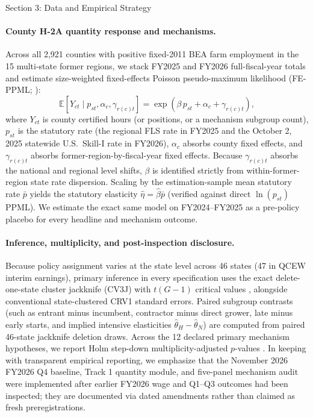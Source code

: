 \begin{llmdraft}{Section 3: Data and Empirical Strategy}
\paragraph{County H-2A quantity response and mechanisms.}
Across all 2,921 counties with positive fixed-2011 BEA farm employment in the 15
multi-state former regions, we stack FY2025 and FY2026 full-fiscal-year totals
and estimate size-weighted fixed-effects Poisson pseudo-maximum likelihood
(FE-PPML; \citealp{silva_tenreyro_2006}):
\begin{equation}
  \mathbb{E}[Y_{ct} \mid p_{st}, \alpha_c, \gamma_{r(c)t}]
  = \exp\!\left(\beta \, p_{st} + \alpha_c + \gamma_{r(c)t}\right),
  \label{eq:qty_ppml}
\end{equation}
where $Y_{ct}$ is county certified hours (or positions, or a mechanism subgroup
count), $p_{st}$ is the statutory rate (the regional FLS rate in FY2025 and the
October 2, 2025 statewide U.S.\ Skill-I rate in FY2026), $\alpha_c$ absorbs
county fixed effects, and $\gamma_{r(c)t}$ absorbs former-region-by-fiscal-year
fixed effects. Because $\gamma_{r(c)t}$ absorbs the national and regional level
shifts, $\beta$ is identified strictly from within-former-region state rate
dispersion. Scaling by the estimation-sample mean statutory rate $\bar{p}$
yields the statutory elasticity $\hat{\eta} = \hat{\beta}\bar{p}$ (verified
against direct $\ln(p_{st})$ PPML). We estimate the exact same model on
FY2024--FY2025 as a pre-policy placebo for every headline and mechanism outcome.

\paragraph{Inference, multiplicity, and post-inspection disclosure.}
Because policy assignment varies at the state level across 46 states (47 in
QCEW interim earnings), primary inference in every specification uses the exact
delete-one-state cluster jackknife (CV3J) with $t(G-1)$ critical values
\citep{mackinnon_nielsen_webb_2023}, alongside conventional state-clustered CRV1
standard errors. Paired subgroup contrasts (such as entrant minus incumbent,
contractor minus direct grower, late minus early starts, and implied intensive
elasticities $\hat{\theta}_H - \hat{\theta}_N$) are computed from paired
46-state jackknife deletion draws. Across the 12 declared primary mechanism
hypotheses, we report Holm step-down multiplicity-adjusted $p$-values
\citep{holm_1979}. In keeping with transparent empirical reporting, we emphasize
that the November 2026 FY2026 Q4 baseline, Track 1 quantity module, and
five-panel mechanism audit were implemented after earlier FY2026 wage and
Q1--Q3 outcomes had been inspected; they are documented via dated amendments
rather than claimed as fresh preregistrations.
\end{llmdraft}

